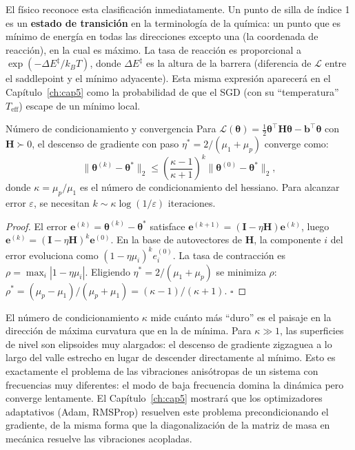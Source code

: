 El físico reconoce esta clasificación inmediatamente. Un punto de silla
de índice 1 es un \textbf{estado de transición} en la terminología de
la química: un punto que es mínimo de energía en todas las direcciones
excepto una (la coordenada de reacción), en la cual es máximo. La tasa
de reacción es proporcional a $\exp(-\Delta E^\ddagger / k_BT)$, donde
$\Delta E^\ddagger$ es la altura de la barrera (diferencia de
$\mathcal{L}$ entre el saddlepoint y el mínimo adyacente). Esta misma
expresión aparecerá en el Capítulo~\ref{ch:cap5} como la probabilidad
de que el SGD (con su ``temperatura'' $T_{\text{eff}}$) escape de un
mínimo local.

\begin{proposicion}{Número de condicionamiento y convergencia}
\label{prop:conv_cuad}
Para $\mathcal{L}(\bm{\theta}) = \frac{1}{2}\bm{\theta}^\top
\bm{H}\bm{\theta} - \bm{b}^\top\bm{\theta}$ con $\bm{H} \succ 0$, el
descenso de gradiente con paso $\eta^* = 2/(\mu_1 + \mu_p)$ converge
como:
\begin{equation}
  \|\bm{\theta}^{(k)} - \bm{\theta}^*\|_2
  \leq \left(\frac{\kappa - 1}{\kappa + 1}\right)^k
  \|\bm{\theta}^{(0)} - \bm{\theta}^*\|_2,
  \label{eq:conv_cuad}
\end{equation}
donde $\kappa = \mu_p/\mu_1$ es el número de condicionamiento del
hessiano. Para alcanzar error $\varepsilon$, se necesitan
$k \sim \kappa \log(1/\varepsilon)$ iteraciones.
\end{proposicion}

\begin{proof}
El error $\bm{e}^{(k)} = \bm{\theta}^{(k)} - \bm{\theta}^*$ satisface
$\bm{e}^{(k+1)} = (\bm{I} - \eta\bm{H})\bm{e}^{(k)}$, luego
$\bm{e}^{(k)} = (\bm{I}-\eta\bm{H})^k\bm{e}^{(0)}$. En la base de
autovectores de $\bm{H}$, la componente $i$ del error evoluciona como
$(1-\eta\mu_i)^k e_i^{(0)}$. La tasa de contracción es
$\rho = \max_i|1-\eta\mu_i|$. Eligiendo $\eta^* = 2/(\mu_1+\mu_p)$ se
minimiza $\rho$:
$\rho^* = (\mu_p-\mu_1)/(\mu_p+\mu_1) = (\kappa-1)/(\kappa+1)$.
$\square$
\end{proof}

El número de condicionamiento $\kappa$ mide cuánto más ``duro'' es el
paisaje en la dirección de máxima curvatura que en la de mínima. Para
$\kappa \gg 1$, las superficies de nivel son elipsoides muy alargados:
el descenso de gradiente zigzaguea a lo largo del valle estrecho en
lugar de descender directamente al mínimo. Esto es exactamente el
problema de las vibraciones anisótropas de un sistema con frecuencias
muy diferentes: el modo de baja frecuencia domina la dinámica pero
converge lentamente. El Capítulo~\ref{ch:cap5} mostrará que los
optimizadores adaptativos (Adam, RMSProp) resuelven este problema
precondicionando el gradiente, de la misma forma que la
diagonalización de la matriz de masa en mecánica resuelve las
vibraciones acopladas.

